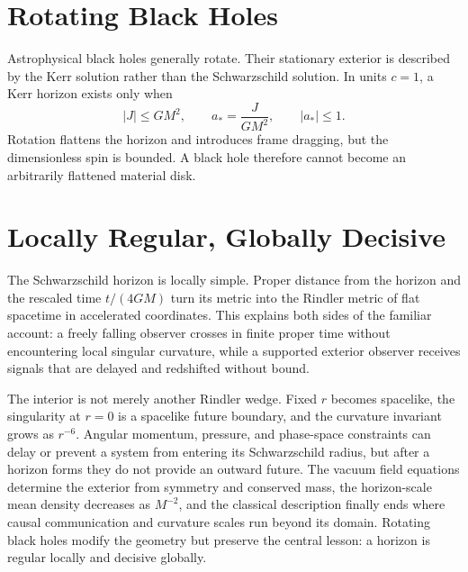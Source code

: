 \section{Rotating Black Holes}

Astrophysical black holes generally rotate.  Their stationary
exterior is described by the Kerr solution rather than the
Schwarzschild solution.  In units \(c=1\), a Kerr horizon exists only
when
\begin{equation}
  |J|\leq GM^2,
  \qquad
  a_*=\frac{J}{GM^2},
  \qquad
  |a_*|\leq1.
  \label{eq:l12-kerr-bound}
\end{equation}
Rotation flattens the horizon and introduces frame dragging, but the
dimensionless spin is bounded.  A black hole therefore cannot become
an arbitrarily flattened material disk.

\begin{classroomqa}
\end{classroomqa}

\section{Locally Regular, Globally Decisive}

The Schwarzschild horizon is locally simple.  Proper distance from
the horizon and the rescaled time \(t/(4GM)\) turn its metric into the
Rindler metric of flat spacetime in accelerated coordinates.  This
explains both sides of the familiar account: a freely falling
observer crosses in finite proper time without encountering local
singular curvature, while a supported exterior observer receives
signals that are delayed and redshifted without bound.

The interior is not merely another Rindler wedge.  Fixed \(r\) becomes
spacelike, the singularity at \(r=0\) is a spacelike future boundary,
and the curvature invariant grows as \(r^{-6}\).  Angular momentum,
pressure, and phase-space constraints can delay or prevent a system
from entering its Schwarzschild radius, but after a horizon forms they
do not provide an outward future.  The vacuum field equations
determine the exterior from symmetry and conserved mass, the
horizon-scale mean density decreases as \(M^{-2}\), and the classical
description finally ends where causal communication and curvature
scales run beyond its domain.  Rotating black holes modify the
geometry but preserve the central lesson: a horizon is regular
locally and decisive globally.
